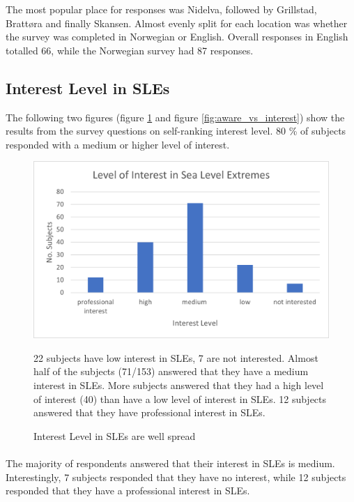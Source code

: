 The most popular place for responses was Nidelva, followed by Grillstad, Brattøra and finally Skansen. Almost evenly split for each location was whether the survey was completed in Norwegian or English. Overall responses in English totalled 66, while the Norwegian survey had 87 responses.  

\subsection{Interest Level in SLEs}
The following two figures (figure \ref{fig:interest_level_SLE} and figure \ref{fig:aware_vs_interest}) show the results from the survey questions on self-ranking interest level. 80 \% of subjects responded with a medium or higher level of interest. 


\begin{figure}[H]
    \centering
    \includegraphics{fig_results/interest-level.png}
    \caption{Interest Level in SLEs are well spread}{22 subjects have low interest in SLEs, 7 are not interested.  Almost half of the subjects (71/153) answered that they have a medium interest in SLEs. More subjects answered that they had a high level of interest (40) than have a low level of interest in SLEs. 12 subjects answered that they have professional interest in SLEs. }
    \label{fig:interest_level_SLE}
\end{figure}
\paragraph{}

The majority of respondents answered that their interest in SLEs is medium. Interestingly, 7 subjects responded that they have no interest, while 12 subjects responded that they have a professional interest in SLEs. 
